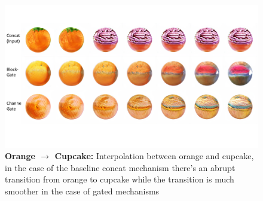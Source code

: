 \documentclass[10pt,twocolumn,letterpaper]{article}
\begin{document}
\begin{figure}[t]
    \centering
    \includegraphics[width=\linewidth]{interpolation-orange-cupcake.pdf}
    \caption{ {\bf Orange $\rightarrow$ Cupcake:} Interpolation between orange and cupcake, in the case of the baseline concat mechanism there's an abrupt transition from orange to cupcake while the transition is much smoother in the case of gated mechanisms }
    \label{fig:inter_orange_cupcake}
    \vspace{-3mm}
\end{figure}
\end{document}
